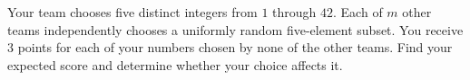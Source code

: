 Your team chooses five distinct integers from $1$ through $42$. Each of $m$ other teams independently chooses a uniformly random five-element subset. You receive $3$ points for each of your numbers chosen by none of the other teams. Find your expected score and determine whether your choice affects it.
